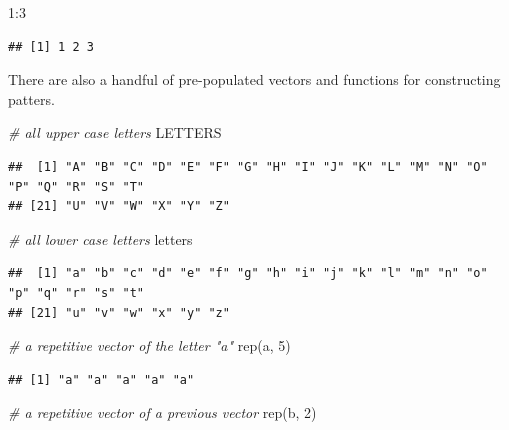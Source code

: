 \documentclass[
]{book}
\newenvironment{Shaded}{\begin{snugshade}}{\end{snugshade}}
\newcommand{\CommentTok}[1]{\textcolor[rgb]{0.56,0.35,0.01}{\textit{#1}}}
\newcommand{\DecValTok}[1]{\textcolor[rgb]{0.00,0.00,0.81}{#1}}
\newcommand{\FunctionTok}[1]{\textcolor[rgb]{0.00,0.00,0.00}{#1}}
\newcommand{\NormalTok}[1]{#1}
\newcommand{\SpecialCharTok}[1]{\textcolor[rgb]{0.00,0.00,0.00}{#1}}
\newcommand{\StringTok}[1]{\textcolor[rgb]{0.31,0.60,0.02}{#1}}
\begin{document}
\begin{Shaded}
\begin{Highlighting}[]
\DecValTok{1}\SpecialCharTok{:}\DecValTok{3}
\end{Highlighting}
\end{Shaded}

\begin{verbatim}
## [1] 1 2 3
\end{verbatim}

There are also a handful of pre-populated vectors and functions for constructing patters.

\begin{Shaded}
\begin{Highlighting}[]
\CommentTok{\# all upper case letters}
\NormalTok{LETTERS}
\end{Highlighting}
\end{Shaded}

\begin{verbatim}
##  [1] "A" "B" "C" "D" "E" "F" "G" "H" "I" "J" "K" "L" "M" "N" "O" "P" "Q" "R" "S" "T"
## [21] "U" "V" "W" "X" "Y" "Z"
\end{verbatim}

\begin{Shaded}
\begin{Highlighting}[]
\CommentTok{\# all lower case letters}
\NormalTok{letters}
\end{Highlighting}
\end{Shaded}

\begin{verbatim}
##  [1] "a" "b" "c" "d" "e" "f" "g" "h" "i" "j" "k" "l" "m" "n" "o" "p" "q" "r" "s" "t"
## [21] "u" "v" "w" "x" "y" "z"
\end{verbatim}

\begin{Shaded}
\begin{Highlighting}[]
\CommentTok{\# a repetitive vector of the letter "a"}
\FunctionTok{rep}\NormalTok{(}\StringTok{\textquotesingle{}a\textquotesingle{}}\NormalTok{, }\DecValTok{5}\NormalTok{)}
\end{Highlighting}
\end{Shaded}

\begin{verbatim}
## [1] "a" "a" "a" "a" "a"
\end{verbatim}

\begin{Shaded}
\begin{Highlighting}[]
\CommentTok{\# a repetitive vector of a previous vector}
\FunctionTok{rep}\NormalTok{(b, }\DecValTok{2}\NormalTok{)}
\end{Highlighting}
\end{Shaded}
\end{document}
